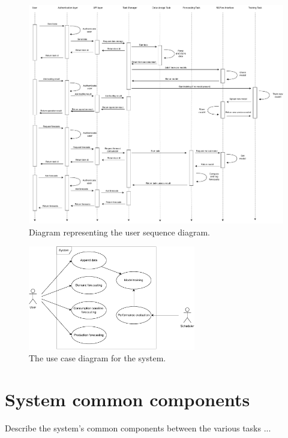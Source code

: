 \begin{figure}[H]
\centering 
\includegraphics[width=1\textwidth]{images/architecture_user_sequence} 
\caption{Diagram representing the user sequence diagram.}
\label{fig:usersequence}
\end{figure}

\begin{figure}[H]
\centering 
\includegraphics[width=0.65\textwidth]{images/architecture_use_case} 
\caption{The use case diagram for the system.}
\label{fig:usecase}
\end{figure}


\section{System common components}
\label{sec:components}
\vspace{0.2 cm}

Describe the system's common components between the various tasks ...

